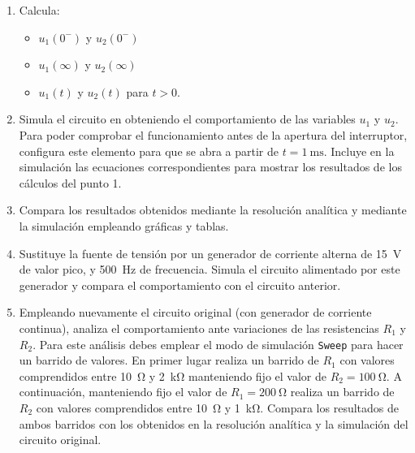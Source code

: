 \documentclass[a4paper,10pt]{article} %
\begin{document}
\begin{enumerate}
\item Calcula:
  \begin{itemize}
  \item $u_1(0^-)$ y $u_2(0^-)$
  \item $u_1(\infty)$ y $u_2(\infty)$
  \item $u_1(t)$ y $u_2(t)$ para $t > 0$.
  \end{itemize}
\item Simula el circuito en {\qucs} obteniendo el comportamiento de
  las variables $u_1$ y $u_2$. Para poder comprobar el funcionamiento
  antes de la apertura del interruptor, configura este elemento para
  que se abra a partir de $t = \qty{1}{\milli\second}$. Incluye en la
  simulación las ecuaciones correspondientes para mostrar los
  resultados de los cálculos del punto 1.
\item Compara los resultados obtenidos mediante la resolución
  analítica y mediante la simulación empleando gráficas y tablas.
\item Sustituye la fuente de tensión por un generador de corriente
  alterna de \qty{15}{\volt} de valor pico, y \qty{500}{\hertz} de
  frecuencia. Simula el circuito alimentado por este generador y
  compara el comportamiento con el circuito anterior.
\item Empleando nuevamente el circuito original
  (con generador de corriente continua),
  analiza el comportamiento ante variaciones de las resistencias $R_1$
  y $R_2$. Para este análisis debes emplear el modo de simulación
  \texttt{Sweep} para hacer un barrido de valores. En primer lugar
  realiza un barrido de $R_1$ con valores comprendidos entre
  \qty{10}{\ohm} y \qty{2}{\kilo\ohm} manteniendo fijo el valor de
  $R_2 = \qty{100}{\ohm}$. A continuación, manteniendo fijo el valor
  de $R_1 = \qty{200}{\ohm}$ realiza un barrido de $R_2$ con valores
  comprendidos entre \qty{10}{\ohm} y \qty{1}{\kilo\ohm}. Compara los
  resultados de ambos barridos con los obtenidos en la resolución
  analítica y la simulación del circuito original.
\end{enumerate}
\end{document}
